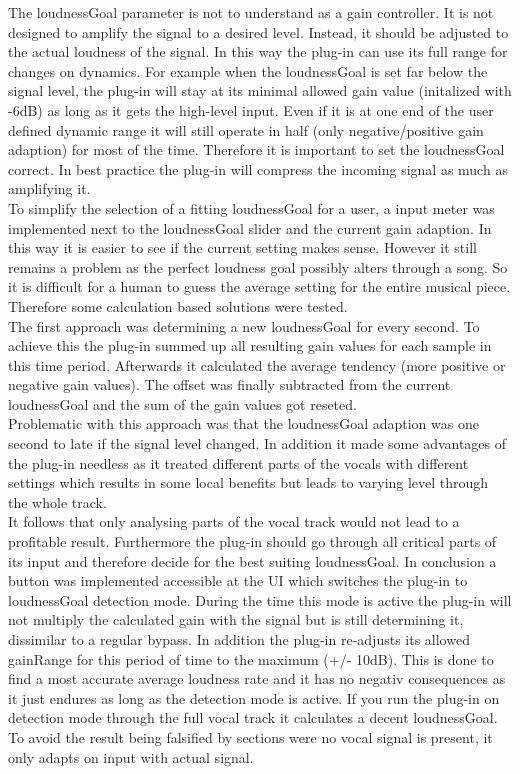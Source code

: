 The loudnessGoal parameter is not to understand as a gain controller. It is not designed to amplify the signal to a desired level. Instead, it should be adjusted to the actual loudness of the signal. In this way the plug-in can use its full range for changes on dynamics. For example when the loudnessGoal is set far below the signal level, the plug-in will stay at its minimal allowed gain value (initalized with -6dB) as long as it gets the high-level input. Even if it is at one end of the user defined dynamic range it will still operate in half (only negative/positive gain adaption) for most of the time. Therefore it is important to set the loudnessGoal correct. In best practice the plug-in will compress the incoming signal as much as amplifying it.\\
To simplify the selection of a fitting loudnessGoal for a user, a input meter was implemented next to the loudnessGoal slider and the current gain adaption. In this way it is easier to see if the current setting makes sense. However it still remains a problem as the perfect loudness goal possibly alters through a song. So it is difficult for a human to guess the average setting for the entire musical piece. Therefore some calculation based solutions were tested.\\
The first approach was determining a new loudnessGoal for every second. To achieve this the plug-in summed up all resulting gain values for each sample in this time period. Afterwards it calculated the average tendency (more positive or negative gain values). The offset was finally subtracted from the current loudnessGoal and the sum of the gain values got reseted.\\
Problematic with this approach was that the loudnessGoal adaption was one second to late if the signal level changed. In addition it made some advantages of the plug-in needless as it treated different parts of the vocals with different settings which results in some local benefits but leads to varying level through the whole track.\\
It follows that only analysing parts of the vocal track would not lead to a profitable result. Furthermore the plug-in should go through all critical parts of its input and therefore decide for the best suiting loudnessGoal. In conclusion a button was implemented accessible at the UI which switches the plug-in to loudnessGoal detection mode. During the time this mode is active the plug-in will not multiply the calculated gain with the signal but is still determining it, dissimilar to a regular bypass. In addition the plug-in re-adjusts its allowed gainRange for this period of time to the maximum (+/- 10dB). This is done to find a most accurate average loudness rate and it has no negativ consequences as it just endures as long as the detection mode is active. If you run the plug-in on detection mode through the full vocal track it calculates a decent loudnessGoal. To avoid the result being falsified by sections were no vocal signal is present, it only adapts on input with actual signal.\\
